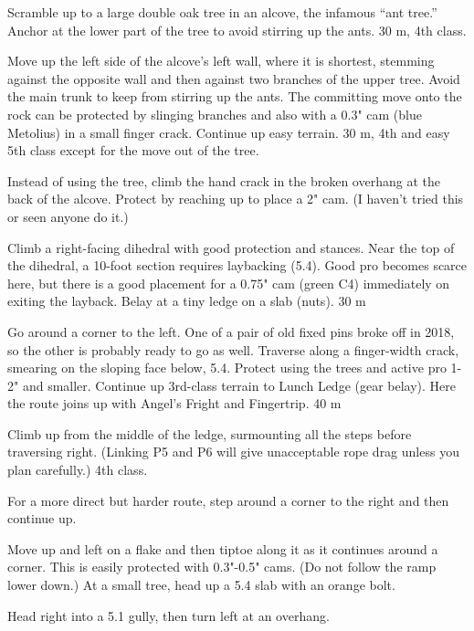 \documentclass{tahquitz}
\begin{document}
 Scramble up to a large double oak tree in an alcove, the infamous
``ant tree.'' Anchor at the lower part of the tree to avoid stirring up
the ants. 30 m, 4th class.

 Move up the left side of the alcove's left wall, where it is
shortest, stemming against the opposite wall and then against two  branches
of the upper tree. Avoid the main trunk to keep from stirring up the ants.
The committing move onto the rock can be protected by slinging branches and
also with a 0.3" cam (blue Metolius) in a small
finger crack. Continue up easy terrain. 30 m, 4th and easy 5th class
except for the move out of the tree.

 Instead of using the tree, climb the hand crack in the broken overhang at
the back of the alcove. Protect by reaching up to place
a 2" cam. (I haven't tried this or seen anyone do it.)

 Climb a right-facing dihedral with good protection and
stances. Near the top of the dihedral, a 10-foot section requires laybacking (5.4).
Good pro becomes scarce here, but there is a good placement for a 0.75" cam (green C4) immediately
on exiting the layback.
Belay at a tiny ledge on a slab (nuts). 30 m

 Go around a corner to the left. One of a pair of old fixed pins
broke off in 2018, so the other is probably ready to go as well.
Traverse along a finger-width crack,
smearing on the sloping face below, 5.4. Protect using the trees and
active pro 1-2" and smaller. Continue up 3rd-class terrain to Lunch Ledge (gear
belay). Here the route joins up with Angel's Fright and Fingertrip. 40 m


 Climb up from the middle of the ledge, surmounting all the steps
before traversing right. (Linking P5 and P6 will
give unacceptable rope drag unless you plan carefully.) 4th class.

 For a more direct but harder route, step around a corner
to the right and then continue up.

 Move up and left on a flake
and then tiptoe along it as it continues around a corner.
This is easily protected with 0.3"-0.5" cams. (Do not follow the ramp lower down.) At a small
tree, head up a 5.4 slab with an orange bolt.

 Head right into a 5.1 gully, then turn left at an overhang.
\end{document}
